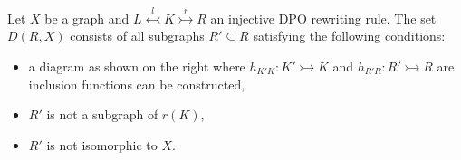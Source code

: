 \begin{definition}
    \label{def:rx}
    Let \(X\) be a graph and 
    \(
        L \overset{l}{\leftarrowtail} K \overset{r}{\rightarrowtail} R
    \) an injective DPO rewriting rule.
    The set \(D(R,X)\) consists of all subgraphs \( R' \subseteq R \)
    satisfying the following conditions:
    \newline
    \noindent
    \begin{minipage}{0.69\textwidth}\setlength{\parindent}{1em}
    \begin{itemize}
        \item a diagram as shown on the right where \(h_{K'K} \colon K' \rightarrowtail K \) and \(h_{R'R} \colon R' \rightarrowtail R \) are inclusion functions can be constructed,
        \item $R'$ is not a subgraph of $r(K)$,
        \item $R'$ is not isomorphic to $X$.
    \end{itemize}
    \end{minipage}
    \begin{minipage}{0.29\textwidth}
        \hfill
        \resizebox{0.9\textwidth}{!}{
        \begin{tikzpicture}[node distance=11mm]

\end{tikzpicture}}
\end{minipage}
\end{definition}
